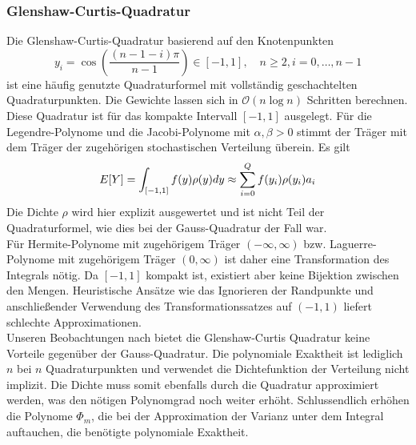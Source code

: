 \subsubsection*{Glenshaw-Curtis-Quadratur}
Die Glenshaw-Curtis-Quadratur basierend auf den Knotenpunkten 
\[y_i=\cos\left(\frac{(n-1-i)\pi}{n-1}\right)\in[-1,1],\quad n\ge 2, i=0,\dots,n-1\]
ist eine häufig genutzte Quadraturformel mit vollständig geschachtelten Quadraturpunkten. Die Gewichte lassen sich in $\mathcal{O}(n\log n)$ Schritten berechnen.\\
Diese Quadratur ist für das kompakte Intervall $[-1,1]$ ausgelegt. Für die Legendre-Polynome und die Jacobi-Polynome mit $\alpha,\beta>0$ stimmt der Träger mit dem Träger der zugehörigen stochastischen Verteilung überein. Es gilt
\[\\E[Y]=\int_{[-1,1]}f(y)\rho(y)dy\approx\sum_{i=0}^Qf(y_i)\rho(y_i)a_i\]
Die Dichte $\rho$ wird hier explizit ausgewertet und ist nicht Teil der Quadraturformel, wie dies bei der Gauss-Quadratur der Fall war.\\
Für Hermite-Polynome mit zugehörigem Träger $(-\infty,\infty)$ bzw. Laguerre-Polynome mit zugehörigem Träger $(0,\infty)$ ist daher eine Transformation des Integrals nötig. Da $[-1,1]$ kompakt ist, existiert aber keine Bijektion zwischen den Mengen. Heuristische Ansätze wie das Ignorieren der Randpunkte und anschließender Verwendung des Transformationssatzes auf $(-1,1)$ liefert schlechte Approximationen.\\
Unseren Beobachtungen nach bietet die Glenshaw-Curtis Quadratur keine Vorteile gegenüber der Gauss-Quadratur. Die polynomiale Exaktheit ist lediglich $n$ bei $n$ Quadraturpunkten und verwendet die Dichtefunktion der Verteilung nicht implizit. Die Dichte muss somit ebenfalls durch die Quadratur approximiert werden, was den nötigen Polynomgrad noch weiter erhöht. Schlussendlich erhöhen die Polynome $\Phi_m$, die bei der Approximation der Varianz unter dem Integral auftauchen, die benötigte polynomiale Exaktheit.
